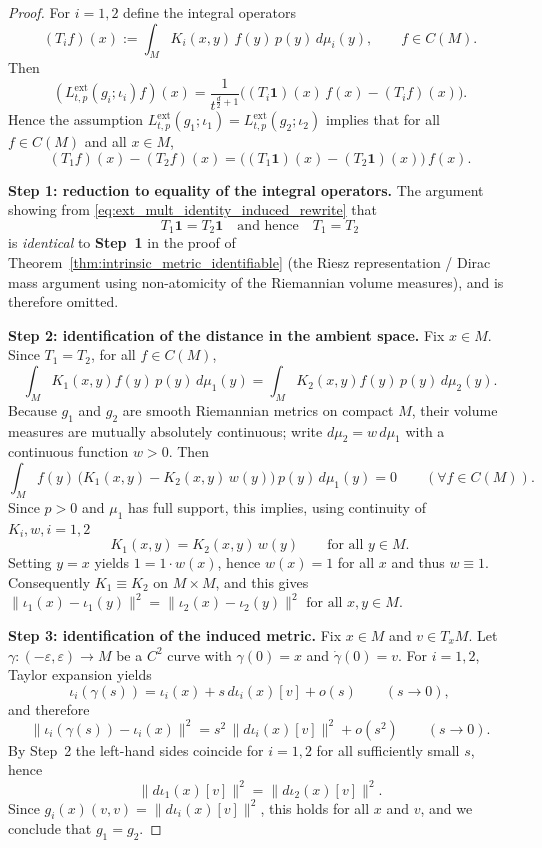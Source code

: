 \documentclass{amsart}
\theoremstyle{definition}
\theoremstyle{remark}
\newcommand{\0}{\boldsymbol{0}}
\begin{document}
\begin{proof}
For $i=1,2$ define the integral operators
\[
(T_i f)(x):=\int_M K_i(x,y)\,f(y)\,p(y)\,d\mu_i(y),
\qquad f\in C(M).
\]
Then
\[
(L^{\mathrm{ext}}_{t,p}(g_i;\iota_i)f)(x)
=\frac{1}{t^{\frac d2+1}}
\Big((T_i\mathbf 1)(x)\,f(x)-(T_i f)(x)\Big).
\]
Hence the assumption
$L^{\mathrm{ext}}_{t,p}(g_1;\iota_1)=L^{\mathrm{ext}}_{t,p}(g_2;\iota_2)$
implies that for all $f\in C(M)$ and all $x\in M$,
\begin{equation}
\label{eq:ext_mult_identity_induced_rewrite}
(T_1 f)(x)-(T_2 f)(x)
=\big((T_1\mathbf 1)(x)-(T_2\mathbf 1)(x)\big)\,f(x).
\end{equation}

\smallskip
\noindent\textbf{Step 1: reduction to equality of the integral operators.}
The argument showing from \eqref{eq:ext_mult_identity_induced_rewrite} that
\[
T_1\mathbf 1=T_2\mathbf 1
\quad\text{and hence}\quad
T_1=T_2
\]
is \emph{identical} to \textbf{Step~1} in the proof of
Theorem~\ref{thm:intrinsic_metric_identifiable}
(the Riesz representation / Dirac mass argument using non-atomicity of the
Riemannian volume measures), and is therefore omitted.

\smallskip
\noindent\textbf{Step 2: identification of the distance in the ambient space.}
Fix $x\in M$. Since $T_1=T_2$, for all $f\in C(M)$,
\[
\int_M K_1(x,y) f(y)\,p(y)\,d\mu_1(y)
=
\int_M K_2(x,y) f(y)\,p(y)\,d\mu_2(y).
\]
Because $g_1$ and $g_2$ are smooth Riemannian metrics on compact $M$,
their volume measures are mutually absolutely continuous; write
$d\mu_2=w\,d\mu_1$ with a continuous function $w>0$.
Then
\[
\int_M f(y)\,\bigl(K_1(x,y)-K_2(x,y)\,w(y)\bigr)\,p(y)\,d\mu_1(y)=0
\qquad(\forall f\in C(M)).
\]
Since $p>0$ and $\mu_1$ has full support, this implies, using continuity of $K_i, w, i=1,2$
\[
K_1(x,y)=K_2(x,y)\,w(y)\qquad\text{for all }y\in M.
\]
Setting $y=x$ yields $1=1\cdot w(x)$, hence $w(x)=1$ for all $x$ and thus
$w\equiv 1$. Consequently $K_1\equiv K_2$ on $M\times M$, and this gives 
\(
\|\iota_1(x)-\iota_1(y)\|^2
=\|\iota_2(x)-\iota_2(y)\|^2
\text{ for all }x,y\in M.
\)

\smallskip
\noindent\textbf{Step 3: identification of the induced metric.}
Fix $x\in M$ and $v\in T_xM$. Let $\gamma:(-\varepsilon,\varepsilon)\to M$
be a $C^2$ curve with $\gamma(0)=x$ and $\dot\gamma(0)=v$.
For $i=1,2$, Taylor expansion yields
\[
\iota_i(\gamma(s))
=\iota_i(x)+s\,d\iota_i(x)[v]+o(s)\qquad(s\to 0),
\]
and therefore
\[
\|\iota_i(\gamma(s))-\iota_i(x)\|^2
=s^2\,\|d\iota_i(x)[v]\|^2+o(s^2)\qquad(s\to 0).
\]
By Step~2 the left-hand sides coincide for $i=1,2$ for all sufficiently small
$s$, hence
\[
\|d\iota_1(x)[v]\|^2=\|d\iota_2(x)[v]\|^2.
\]
Since $g_i(x)(v,v)=\|d\iota_i(x)[v]\|^2$, this holds for all $x$ and $v$,
and we conclude that $g_1=g_2$.
\end{proof}
\end{document}

